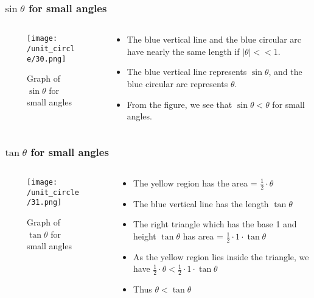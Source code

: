     \begin{frame}
        \frametitle{\(\sin \theta\) for small angles}
        \begin{columns}
            \begin{column}{0.5\textwidth}
                \begin{figure}
                    \centering
                    \texttt{[image: /unit\_circle/30.png]}
                    \caption{Graph of \(\sin \theta\) for small angles}
                \end{figure}
            \end{column}
            \begin{column}{0.5\textwidth}
                \begin{itemize}
                    \item The blue vertical line and the blue circular arc have nearly the same length if \(|\theta| << 1\).
                    \item The blue vertical line represents \(\sin \theta\), and the blue circular arc represents \(\theta\).
                    \item From the figure, we see that \(\sin \theta < \theta\) for small angles.
                \end{itemize}
            \end{column}
        \end{columns}
        \end{frame}

    \begin{frame}
        \frametitle{\(\tan \theta\) for small angles}
        \begin{columns}
            \begin{column}{0.5\textwidth}
                \begin{figure}
                    \centering
                    \texttt{[image: /unit\_circle/31.png]}
                    \caption{Graph of \(\tan \theta\) for small angles}
                \end{figure}
            \end{column}
            \begin{column}{0.5\textwidth}
                \begin{itemize}
                    \item The yellow region has the area = \(\frac{1}{2} \cdot \theta\)  
                    \item The blue vertical line has the length \(\tan \theta\) 
                    \item The right triangle which has the base 1 and height \(\tan \theta\) has area = \(\frac{1}{2} \cdot 1 \cdot \tan \theta\)
                    \item As the yellow region lies inside the triangle, we have \(\frac{1}{2} \cdot \theta < \frac{1}{2} \cdot 1 \cdot \tan \theta\)  
                    \item Thus \(\theta < \tan \theta\)     
                \end{itemize}
            \end{column}
        \end{columns}
    \end{frame}

